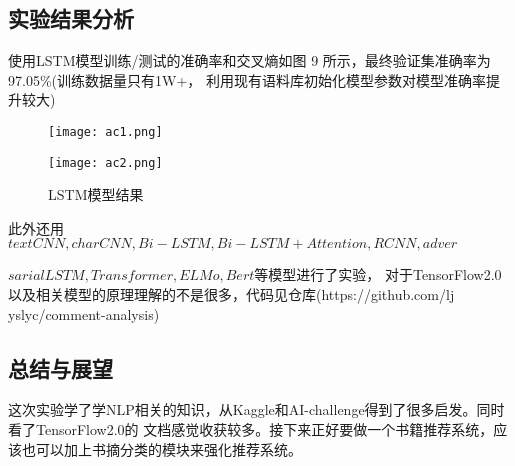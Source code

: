 \documentclass[withoutpreface,bwprint]{cumcmthesis} %
\begin{document}
\subsection{实验结果分析}
使用LSTM模型训练/测试的准确率和交叉熵如图 9 所示，最终验证集准确率为97.05\%(训练数据量只有1W+，
利用现有语料库初始化模型参数对模型准确率提升较大)

\begin{figure}[H]
    \centering
    \begin{minipage}[c]{0.4\textwidth}
        \centering
        \texttt{[image: ac1.png]}
    \end{minipage}
    \begin{minipage}[c]{0.5\textwidth}
        \centering
        \texttt{[image: ac2.png]}
    \end{minipage}
    \caption{LSTM模型结果}
\end{figure}
此外还用$textCNN,charCNN,Bi-LSTM,Bi-LSTM + Attention,RCNN,adver$

\noindent$sarialLSTM,Transformer,ELMo,Bert$等模型进行了实验，
对于TensorFlow2.0以及相关模型的原理理解的不是很多，代码见仓库(https://github.com/lj
yslyc/comment-analysis)

\subsection{总结与展望}

这次实验学了学NLP相关的知识，从Kaggle和AI-challenge得到了很多启发。同时看了TensorFlow2.0的
文档感觉收获较多。接下来正好要做一个书籍推荐系统，应该也可以加上书摘分类的模块来强化推荐系统。
\end{document}
